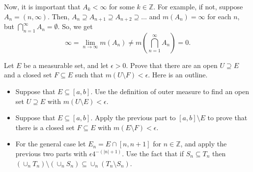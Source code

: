 \documentclass[12pt]{article}
\newenvironment{problem}[2][Problem]{\begin{trivlist}
\item[\hskip \labelsep {\bfseries #1}\hskip \labelsep {\bfseries
#2.}]}{\end{trivlist}}
\begin{document}
  Now, it is important that $A_k < \infty$ for some $k \in \mathbb{Z}$. For example, if not, suppose $A_n = (n,\infty)$. Then, $A_n \supseteq A_{n+1} \supseteq A_{n + 2} \supseteq \dots$ and $m(A_n) = \infty$ for each $n$, but $\bigcap_{n = 1}^{\infty}A_n = \emptyset$. So, we get $$\infty = \lim_{n \to \infty} m(A_n) \neq m(\bigcap_{n = 1}^{\infty}A_n) = 0.$$
  
  \begin{problem}{39}
    Let $E$ be a measurable set, and let $\epsilon > 0$. Prove that there are an open $U \supseteq E$ and a closed set $F \subseteq E$ such that $m(U \setminus F) < \epsilon$. Here is an outline.
  
    \begin{itemize}
      \item[(a)] Suppose that $E \subseteq [a,b]$. Use the definition of outer measure to find an open set $U \supseteq E$ with $m(U \setminus E) < \epsilon$.
      \item[(b)] Suppose that $E \subseteq [a,b]$. Apply the previous part to $[a,b] \setminus E$ to prove that there is a closed set $F \subseteq E$ with $m(E \setminus F) < \epsilon$.
      \item[(c)] For the general case let $E_n = E \cap [n,n+1]$ for $n \in \mathbb{Z}$, and apply the previous two parts with $\epsilon4^{-(|n|+1)}$. Use the fact that if $S_n \subseteq T_n$ then $(\cup_nT_n) \setminus (\cup_nS_n) \subseteq \cup_n(T_n \setminus S_n)$.
    \end{itemize}
  \end{problem}
\end{document}
